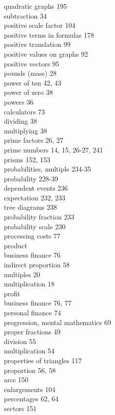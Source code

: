 \documentclass[10pt]{article}
\begin{document}
quadratic graphs 195\\
subtraction 34\\
positive scale factor 104\\
positive terms in formulas 178\\
positive translation 99\\
positive values on graphs 92\\
positive vectors 95\\
pounds (mass) 28\\
power of ten 42, 43\\
power of zero 38\\
powers 36\\
calculators 73\\
dividing 38\\
multiplying 38\\
prime factors 26, 27\\
prime numbers 14, 15, 26-27, 241\\
prisms 152, 153\\
probabilities, multiple 234-35\\
probability 228-39\\
dependent events 236\\
expectation 232, 233\\
tree diagrams 238\\
probability fraction 233\\
probability scale 230\\
processing costs 77\\
product\\
business finance 76\\
indirect proportion 58\\
multiples 20\\
multiplication 18\\
profit\\
business finance 76, 77\\
personal finance 74\\
progression, mental mathematics 69\\
proper fractions 49\\
division 55\\
multiplication 54\\
properties of triangles 117\\
proportion 56, 58\\
arcs 150\\
enlargements 104\\
percentages 62, 64\\
sectors 151\\
\end{document}
